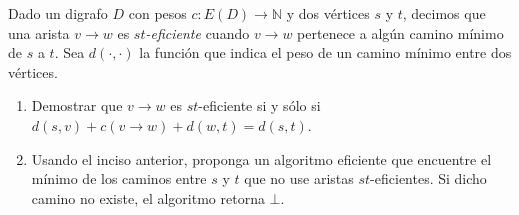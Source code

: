   \item Dado un digrafo $D$ con pesos $c\colon E(D) \to \mathbb{N}$ y dos vértices $s$ y $t$, decimos que una arista $v \to w$ es \emph{$st$-eficiente} cuando $v \to w$ pertenece a algún camino mínimo de $s$ a $t$.  Sea $d(\cdot,\cdot)$ la función que indica el peso de un camino mínimo entre dos vértices.\label{ej:segundo-camino}
  \begin{enumerate}[label=$\alph*$.,ref=$\alph*$]
   \item Demostrar que $v \to w$ es $st$-eficiente si y sólo si $d(s, v) + c(v \to w) + d(w, t) = d(s,t)$.\label{ej:segundo-camino:eficiencia}
   \item Usando el inciso anterior, proponga un algoritmo eficiente que encuentre el mínimo de los caminos entre $s$ y $t$ que no use aristas $st$-eficientes.  Si dicho camino no existe, el algoritmo retorna $\bot$.
  \end{enumerate}
